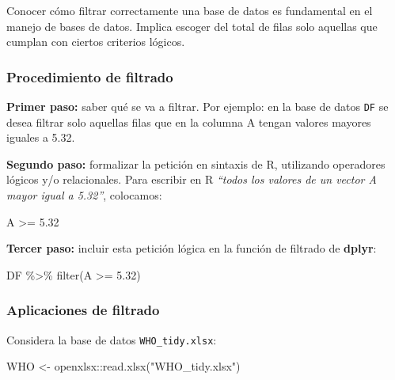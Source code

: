 \documentclass[
]{article}
\newenvironment{Shaded}{\begin{snugshade}}{\end{snugshade}}
\newcommand{\FloatTok}[1]{\textcolor[rgb]{0.00,0.00,0.81}{#1}}
\newcommand{\FunctionTok}[1]{\textcolor[rgb]{0.00,0.00,0.00}{#1}}
\newcommand{\NormalTok}[1]{#1}
\newcommand{\OtherTok}[1]{\textcolor[rgb]{0.56,0.35,0.01}{#1}}
\newcommand{\SpecialCharTok}[1]{\textcolor[rgb]{0.00,0.00,0.00}{#1}}
\newcommand{\StringTok}[1]{\textcolor[rgb]{0.31,0.60,0.02}{#1}}
\theoremstyle{definition}
\theoremstyle{definition}
\theoremstyle{definition}
\theoremstyle{definition}
\theoremstyle{remark}
\begin{document}
Conocer cómo filtrar correctamente una base de datos es fundamental en el manejo de bases de datos. Implica escoger del total de filas solo aquellas que cumplan con ciertos criterios lógicos.

\hypertarget{procedimiento-de-filtrado}{%
\subsubsection{Procedimiento de filtrado}\label{procedimiento-de-filtrado}}

\textbf{Primer paso:} saber qué se va a filtrar. Por ejemplo: en la base de datos \texttt{DF} se desea filtrar solo aquellas filas que en la columna A tengan valores mayores iguales a 5.32.

\textbf{Segundo paso:} formalizar la petición en sintaxis de R, utilizando operadores lógicos y/o relacionales. Para escribir en R \emph{``todos los valores de un vector A mayor igual a 5.32''}, colocamos:

\begin{Shaded}
\begin{Highlighting}[]
\NormalTok{A }\SpecialCharTok{\textgreater{}=} \FloatTok{5.32}
\end{Highlighting}
\end{Shaded}

\textbf{Tercer paso:} incluir esta petición lógica en la función de filtrado de \textbf{dplyr}:

\begin{Shaded}
\begin{Highlighting}[]
\NormalTok{DF }\SpecialCharTok{\%\textgreater{}\%} \FunctionTok{filter}\NormalTok{(A }\SpecialCharTok{\textgreater{}=} \FloatTok{5.32}\NormalTok{)}
\end{Highlighting}
\end{Shaded}

\hypertarget{aplicaciones-de-filtrado}{%
\subsubsection{Aplicaciones de filtrado}\label{aplicaciones-de-filtrado}}

Considera la base de datos \texttt{WHO\_tidy.xlsx}:

\begin{Shaded}
\begin{Highlighting}[]
\NormalTok{WHO }\OtherTok{\textless{}{-}}\NormalTok{ openxlsx}\SpecialCharTok{::}\FunctionTok{read.xlsx}\NormalTok{(}\StringTok{"WHO\_tidy.xlsx"}\NormalTok{)}
\end{Highlighting}
\end{Shaded}
\end{document}
